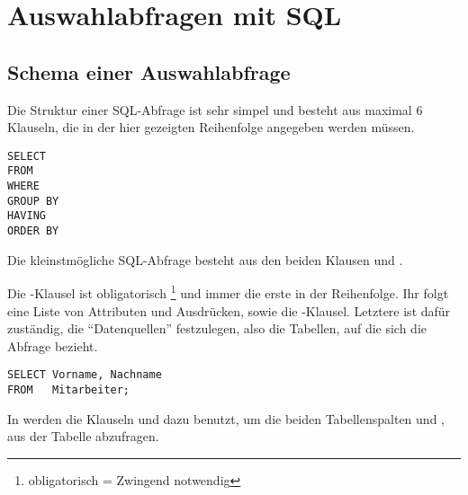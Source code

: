 \section{Auswahlabfragen mit SQL}
\subsection{Schema einer Auswahlabfrage}
Die Struktur einer SQL-Abfrage ist sehr simpel und besteht aus maximal 6 Klauseln, die in der hier gezeigten Reihenfolge angegeben werden müssen.
\begin{lstlisting}[emph={WHERE,GROUP,BY,HAVING,ORDER}, emphstyle=\color{lightgray}, language=oracle_sql, label=sql01_01]
SELECT
FROM
WHERE
GROUP BY
HAVING
ORDER BY
        \end{lstlisting}
\begin{merke}
    Die kleinstmögliche SQL-Abfrage besteht aus den beiden Klausen  und .
\end{merke}

Die -Klausel ist obligatorisch \footnote{obligatorisch = Zwingend notwendig} und immer die erste in der Reihenfolge. Ihr folgt eine Liste von Attributen und Ausdrücken, sowie die -Klausel. Letztere ist dafür zuständig, die \enquote{Datenquellen} festzulegen, also die Tabellen, auf die sich die Abfrage bezieht.
\begin{lstlisting}[language=oracle_sql,caption={Eine einfache Auswahlabfrage in Oracle},label=sql01_02]
SELECT Vorname, Nachname
FROM   Mitarbeiter;
        \end{lstlisting}
In  werden die Klauseln  und  dazu benutzt, um die beiden Tabellenspalten  und , aus der Tabelle  abzufragen.


